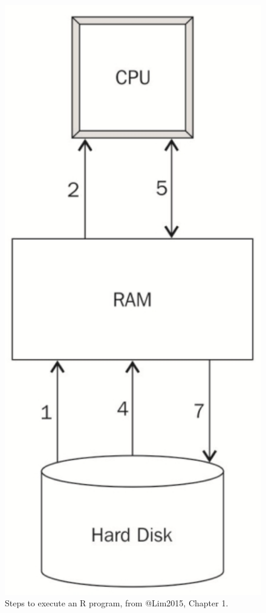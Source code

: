 \documentclass[]{book}
\theoremstyle{definition}
\theoremstyle{definition}
\theoremstyle{definition}
\theoremstyle{remark}
\begin{document}
\begin{figure}

{\centering \includegraphics[width=7.08in]{images/ch1_bottlenecks} 

}

\caption{Steps to execute an R program, from @Lim2015, Chapter 1.}\label{fig:bottlenecks}
\end{figure}
\end{document}
